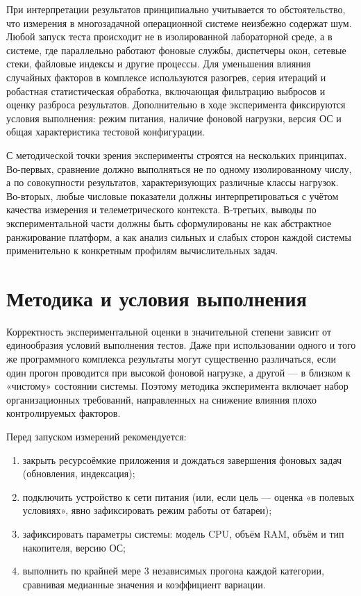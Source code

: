 При интерпретации результатов принципиально учитывается то обстоятельство, что измерения в многозадачной операционной системе неизбежно содержат шум. Любой запуск теста происходит не в изолированной лабораторной среде, а в системе, где параллельно работают фоновые службы, диспетчеры окон, сетевые стеки, файловые индексы и другие процессы. Для уменьшения влияния случайных факторов в комплексе используются разогрев, серия итераций и робастная статистическая обработка, включающая фильтрацию выбросов и оценку разброса результатов. Дополнительно в ходе эксперимента фиксируются условия выполнения: режим питания, наличие фоновой нагрузки, версия ОС и общая характеристика тестовой конфигурации.

С методической точки зрения эксперименты строятся на нескольких принципах. Во-первых, сравнение должно выполняться не по одному изолированному числу, а по совокупности результатов, характеризующих различные классы нагрузок. Во-вторых, любые числовые показатели должны интерпретироваться с учётом качества измерения и телеметрического контекста. В-третьих, выводы по экспериментальной части должны быть сформулированы не как абстрактное ранжирование платформ, а как анализ сильных и слабых сторон каждой системы применительно к конкретным профилям вычислительных задач.

\section{Методика и условия выполнения}

Корректность экспериментальной оценки в значительной степени зависит от единообразия условий выполнения тестов. Даже при использовании одного и того же программного комплекса результаты могут существенно различаться, если один прогон проводится при высокой фоновой нагрузке, а другой --- в близком к «чистому» состоянии системы. Поэтому методика эксперимента включает набор организационных требований, направленных на снижение влияния плохо контролируемых факторов.

Перед запуском измерений рекомендуется:
\begin{enumerate}
    \item закрыть ресурсоёмкие приложения и дождаться завершения фоновых задач (обновления, индексация);
    \item подключить устройство к сети питания (или, если цель — оценка «в полевых условиях», явно зафиксировать режим работы от батареи);
    \item зафиксировать параметры системы: модель CPU, объём RAM, объём и тип накопителя, версию ОС;
    \item выполнить по крайней мере 3 независимых прогона каждой категории, сравнивая медианные значения и коэффициент вариации.
\end{enumerate}

